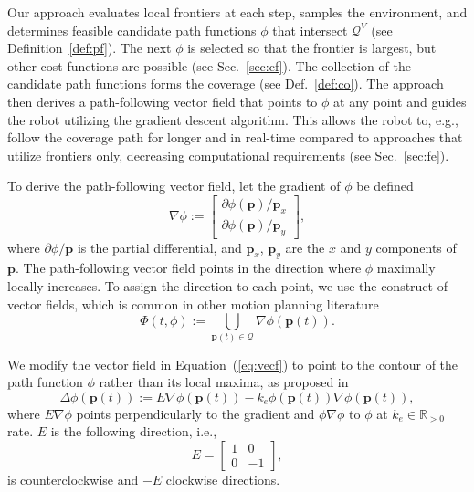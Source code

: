 \documentclass[letterpaper,10pt,conference,twoside]{IEEEtran}
\theoremstyle{definition}
\begin{document}
Our 
approach evaluates local frontiers at each step, samples the environment, and determines feasible candidate path functions $\phi$ that intersect $\mathcal{Q}^V$ (see Definition~\ref{def:pf}).
The next $\phi$ is selected so that the frontier is largest, but other cost functions are possible (see Sec.~\ref{sec:cf}). The collection of the candidate path functions forms the coverage (see Def.~\ref{def:co}).
The %
approach then derives a path-following vector field that points to $\phi$ at any point and guides the robot utilizing the gradient descent algorithm. This allows the robot to, e.g., follow the coverage path for longer and in real-time compared to approaches that utilize frontiers only, decreasing computational requirements (see Sec.~\ref{sec:fe}).

To derive the path-following vector field, let the gradient of $\phi$ be defined
\begin{equation}
  \nabla\phi:=\begin{bmatrix}
    \partial\phi(\mathbf{p})/\mathbf{p}_x\\
    \partial\phi(\mathbf{p})/\mathbf{p}_y
  \end{bmatrix},
\end{equation}
where $\partial\phi/\mathbf{p}$ is the partial differential, and $\mathbf{p}_x$, $\mathbf{p}_y$ are the $x$ and $y$ components of $\mathbf{p}$.
The path-following vector field points in the direction where $\phi$ maximally locally increases. To assign the direction to each point, we use the construct of vector fields, which is common in other motion planning literature~\cite{%
garcia2017guidance,goncalves2010vector}
\begin{equation}\label{eq:vecf}
  \Phi(t,\phi):={\textstyle \bigcup\limits_{\mathbf{p}(t)\in\mathcal{Q}}}\nabla\phi(\mathbf{p}(t)).
\end{equation}

We modify the vector field in Equation~(\ref{eq:vecf}) to point to the contour of the path function $\phi$ rather than its local maxima, as proposed in~\cite{garcia2017guidance}
\begin{equation}\label{eq:pfvf}
  \Delta\phi(\mathbf{p}(t)):=E\nabla\phi(\mathbf{p}(t))-k_e\phi(\mathbf{p}(t))\nabla\phi(\mathbf{p}(t)),
\end{equation}
where $E\nabla\phi$ points perpendicularly to the gradient and $\phi\nabla\phi$ to $\phi$ at $k_e\in\mathbb{R}_{>0}$ rate. $E$ is the following direction, i.e.,
\begin{equation}
  E=\begin{bmatrix}
    1 & 0\\ 0 & -1
  \end{bmatrix},
\end{equation}
is counterclockwise and $-E$ clockwise directions.%
\end{document}
